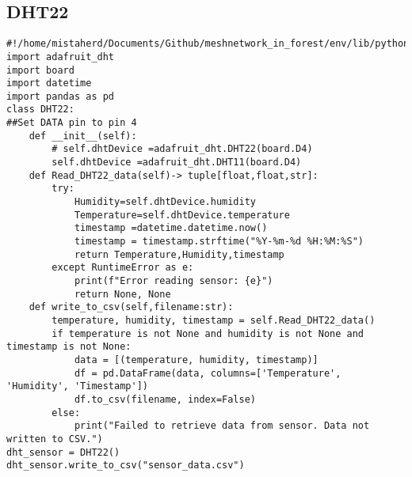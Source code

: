 \subsection{DHT22}
\begin{lstlisting}[style=mystyle,caption={DHT22code}]
#!/home/mistaherd/Documents/Github/meshnetwork_in_forest/env/lib/python3.11
import adafruit_dht 
import board
import datetime
import pandas as pd
class DHT22:
##Set DATA pin to pin 4
    def __init__(self):
        # self.dhtDevice =adafruit_dht.DHT22(board.D4)
        self.dhtDevice =adafruit_dht.DHT11(board.D4)
    def Read_DHT22_data(self)-> tuple[float,float,str]:
        try:
            Humidity=self.dhtDevice.humidity
            Temperature=self.dhtDevice.temperature
            timestamp =datetime.datetime.now()
            timestamp = timestamp.strftime("%Y-%m-%d %H:%M:%S")
            return Temperature,Humidity,timestamp
        except RuntimeError as e:
            print(f"Error reading sensor: {e}")
            return None, None
    def write_to_csv(self,filename:str):
        temperature, humidity, timestamp = self.Read_DHT22_data()
        if temperature is not None and humidity is not None and timestamp is not None:
            data = [(temperature, humidity, timestamp)]
            df = pd.DataFrame(data, columns=['Temperature', 'Humidity', 'Timestamp'])
            df.to_csv(filename, index=False)
        else:
            print("Failed to retrieve data from sensor. Data not written to CSV.")
dht_sensor = DHT22()
dht_sensor.write_to_csv("sensor_data.csv")
\end{lstlisting}
